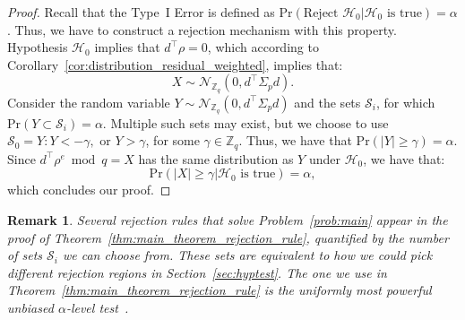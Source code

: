 \documentclass[journal, twoside, web]{ieeecolorpreprint}
\newtheorem{rem}{Remark}
\begin{document}
\begin{proof}
Recall that the Type~I Error is defined as $\mathrm{Pr} (\text{Reject } \mathcal{H}_0 | \mathcal{H}_0 \text{ is true})=\alpha$. Thus, we have to construct a rejection mechanism with this property. Hypothesis $\mathcal{H}_0$ implies that $d^\top \rho=0$, which according to Corollary~\ref{cor:distribution_residual_weighted}, implies that:
    \begin{equation*} 
        X \sim \mathcal{N}_{\mathbb{Z}_q}(0, d^\top \Sigma_p d).
    \end{equation*}
    Consider the random variable $Y\sim \mathcal{N}_{\mathbb{Z}_q}(0, d^\top \Sigma_p d)$ and the sets $\mathcal{S}_i$, for which $\mathrm{Pr}(Y\subset \mathcal{S}_i)=\alpha$. Multiple such sets may exist, but we choose to use $\mathcal{S}_0={Y: Y<-\gamma, \text{ or }  Y > \gamma}$, for some $\gamma\in \mathbb{Z}_q$. Thus, we have that $\mathrm{Pr}(|Y|\geq \gamma)=\alpha$. Since $d^\top\rho^e \bmod q=X$ has the same distribution as $Y$ under $\mathcal{H}_0$, we have that: $$\mathrm{Pr}\left (\left. |X|\geq \gamma \right \vert \mathcal{H}_0 \text{ is true} \right )=\alpha,$$ which concludes our proof.
\end{proof}
\begin{rem}
    Several rejection rules that solve Problem~\ref{prob:main} appear in the proof of Theorem~\ref{thm:main_theorem_rejection_rule}, quantified by the number of sets $\mathcal{S}_i$ we can choose from. These sets are equivalent to how we could pick different rejection regions in Section~\ref{sec:hyptest}. The one we use in Theorem~\ref{thm:main_theorem_rejection_rule} is the \emph{uniformly most powerful unbiased} $\alpha$-level test~\cite{Lehmann2005}.
\end{rem}
\end{document}
